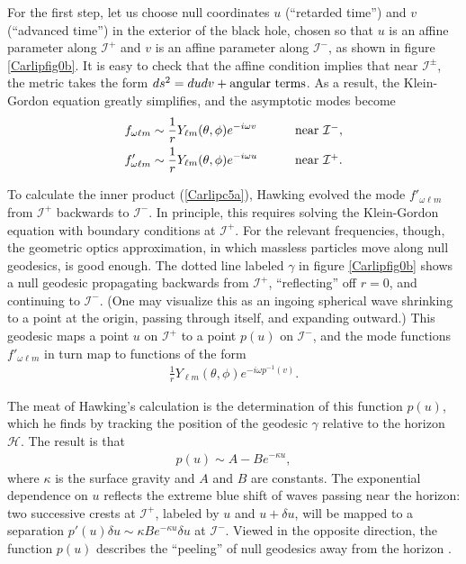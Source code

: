 \documentclass[12pt]{article}
\begin{document}
For the first step, let us choose null coordinates $u$ (``retarded time'')
and $v$ (``advanced time'') in the exterior of the black hole, chosen so
that $u$ is an affine parameter along $\mathcal{I}^+$ and $v$ is an
affine parameter along $\mathcal{I}^-$, as shown in figure \ref{Carlipfig0b}.
It is easy to check that the affine condition implies that near
$\mathcal{I}^\pm$, the metric takes the form $ds^2 = dudv + \hbox{angular
terms}$.  As a result, the Klein-Gordon equation greatly simplifies, and the
asymptotic modes become
\begin{alignat}{3}
&f_{\omega \ell m} \sim \frac{1}{r}Y_{\ell m}(\theta,\phi)e^{-i\omega v} 
  \qquad &&\hbox{near $\mathcal{I}^-$} ,\nonumber\\
&f'_{\omega \ell m} \sim \frac{1}{r}Y_{\ell m}(\theta,\phi)e^{-i\omega u} 
  \qquad &&\hbox{near $\mathcal{I}^+$}   .
\label{Carlipc7}
\end{alignat}

To calculate the inner product (\ref{Carlipc5a}), Hawking evolved 
the mode $f'_{\omega \ell m}$ from $\mathcal{I}^+$ backwards to 
$\mathcal{I}^-$.  In principle, this requires solving the Klein-Gordon equation 
with boundary conditions at $\mathcal{I}^+$.   For the relevant frequencies, 
though, the geometric optics approximation, in which massless particles move 
along null geodesics, is good enough.   The dotted line labeled $\gamma$
in figure \ref{Carlipfig0b} shows a null geodesic propagating backwards 
from $\mathcal{I}^+$, ``reflecting'' off $r=0$, and continuing to 
$\mathcal{I}^-$.  (One may visualize this as an ingoing spherical 
wave shrinking to a point at the origin, passing through itself, and expanding 
outward.)  This geodesic maps a point $u$ on $\mathcal{I}^+$ to a 
point $p(u)$ on $\mathcal{I}^-$, and the mode functions $f'_{\omega \ell m}$
in turn map to functions of the form
\begin{align}
\frac{1}{r}Y_{\ell m}(\theta,\phi)e^{-i\omega p^{-1}(v)}   .
\label{Carlipc8}
\end{align}

The meat of Hawking's calculation is the determination of this function
$p(u)$, which he finds by tracking the position of the geodesic
$\gamma$ relative to the horizon $\mathcal{H}$.   The result is that
\begin{align}
p(u) \sim A - Be^{-\kappa u}  ,
\label{Carlipc9}
\end{align}
where $\kappa$ is the surface gravity and $A$ and $B$ are constants.  The 
exponential dependence on $u$ reflects the extreme blue shift of waves
passing near the horizon: two successive crests at $\mathcal{I}^+$,
labeled by $u$ and $u+\delta u$, will be mapped to a separation 
$p'(u)\delta u \sim \kappa Be^{-\kappa u}\delta u$ at $\mathcal{I}^-$.
Viewed in the opposite direction, the function $p(u)$ describes the
``peeling'' of null geodesics away from the horizon \cite{BLSV}.
\end{document}
